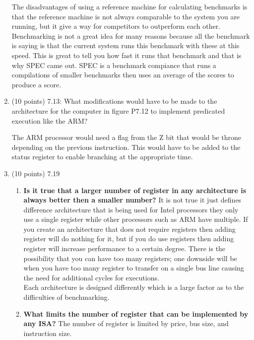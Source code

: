 \documentclass[letterpaper,10pt,onecolumn,titlepage]{article}
\begin{document}
\begin{enumerate}
\begin{mdframed}[style=MyFrame]
 The disadvantages of using a reference machine for calculating benchmarks is that the reference machine is not always comparable to the system you are running, but it give a way for competitors to outperform each other. Benchmarking is not a great idea for many reasons because all the benchmark is saying is that the current system runs this benchmark with these at this speed. This is great to tell you how fast it runs that benchmark and that is why SPEC came out. SPEC is a benchmark compiance that runs a compilations of smaller benchmarks then uses an average of the scores to produce a score. 
\end{mdframed}

\newpage
\item (10 points) 7.13: What modifications would have to be made to the architecture for the computer in figure P7.12 to implement predicated execution like the ARM?
\begin{mdframed}[style=MyFrame]
The ARM processor would need a flag from the Z bit that would be throne depending on the previous instruction. This would have to be added to the status register to enable branching at the appropriate time. 
\end{mdframed}
\item (10 points) 7.19
\begin{mdframed}[style=MyFrame]
\begin{enumerate}
\item \textbf{Is it true that a larger number of register in any architecture is always better then a smaller number?} It is not true it just defines difference architecture that is being used for Intel processors they only use a single register while other processors such as ARM have multiple.  If you create an architecture that does not require registers then adding register will do nothing for it, but if you do use registers then adding register will increase performance to a certain degree. There is the possibility that you can have too many registers; one downside will be when you have too many register to transfer on a single bus line causing the need for additional cycles for executions. \\ 
Each architecture is designed differently which is a large factor as to the difficulties of benchmarking. 
\item \textbf{What limits the number of register that can be implemented by any ISA? } The number of register is limited by price, bus size, and instruction size.

\end{enumerate}
\end{mdframed}
\end{enumerate}
\end{document}
